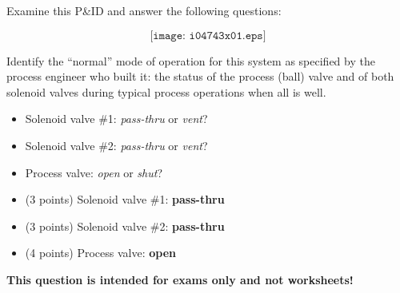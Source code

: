 

Examine this P\&ID and answer the following questions:

$$\texttt{[image: i04743x01.eps]}$$

\vskip 10pt

Identify the ``normal'' mode of operation for this system as specified by the process engineer who built it: the status of the process (ball) valve and of both solenoid valves during typical process operations when all is well.

\begin{itemize}
\item{} Solenoid valve \#1: {\it pass-thru} or {\it vent}?
\vskip 10pt
\item{} Solenoid valve \#2: {\it pass-thru} or {\it vent}?
\vskip 10pt
\item{} Process valve: {\it open} or {\it shut}?
\end{itemize}







\begin{itemize}
\item{} (3 points) Solenoid valve \#1: {\bf pass-thru}
\vskip 10pt
\item{} (3 points) Solenoid valve \#2: {\bf pass-thru}
\vskip 10pt
\item{} (4 points) Process valve: {\bf open}
\end{itemize}







{\bf This question is intended for exams only and not worksheets!}



